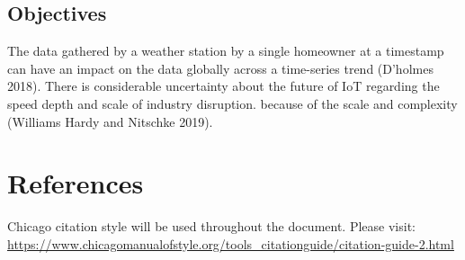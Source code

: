 \documentclass{bscs}
\begin{document}
\section{Objectives}
The data gathered by a weather station by a single homeowner at a timestamp can have an impact on the data globally across a time-series trend (D’holmes 2018). There is considerable uncertainty about the future of IoT regarding the speed depth and scale of industry disruption. because of the scale and complexity (Williams Hardy and Nitschke 2019).


\chapter{References}
Chicago citation style will be used throughout the document. Please visit:
\url{https://www.chicagomanualofstyle.org/tools_citationguide/citation-guide-2.html}


\end{document}

